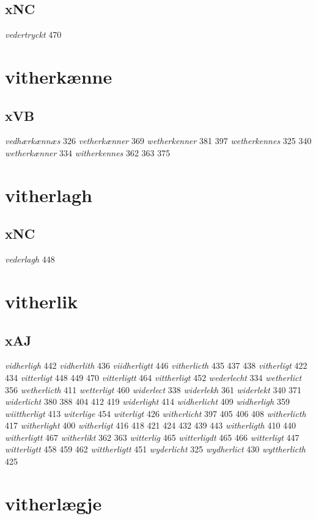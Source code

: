 \documentclass[a4paper,twocolumn]{article}
\begin{document}
\subsection{xNC}
\label{sec:org443a210}
\emph{vedertryckt} 470 
\section{vitherkænne}
\label{sec:org26f16c8}
\subsection{xVB}
\label{sec:orgbdf1f46}
\emph{vedhærkænnæs} 326 \emph{vetherkænner} 369 \emph{wetherkenner} 381 397 \emph{wetherkennes} 325 340 \emph{wetherkænner} 334 \emph{witherkennes} 362 363 375 
\section{vitherlagh}
\label{sec:orga76be92}
\subsection{xNC}
\label{sec:org970b84c}
\emph{vederlagh} 448 
\section{vitherlik}
\label{sec:org46df9df}
\subsection{xAJ}
\label{sec:org80afa6c}
\emph{vidherligh} 442 \emph{vidherlith} 436 \emph{viidherligtt} 446 \emph{vitherlicth} 435 437 438 \emph{vitherligt} 422 434 \emph{vitterligt} 448 449 470 \emph{vitterligtt} 464 \emph{vittherligt} 452 \emph{wederlecht} 334 \emph{wetherlict} 356 \emph{wetherlicth} 411 \emph{wetterligt} 460 \emph{widerlect} 338 \emph{widerlekh} 361 \emph{widerlekt} 340 371 \emph{widerlicht} 380 388 404 412 419 \emph{widerlight} 414 \emph{widherlicht} 409 \emph{widherligh} 359 \emph{wiittherligt} 413 \emph{witerlige} 454 \emph{witerligt} 426 \emph{witherlicht} 397 405 406 408 \emph{witherlicth} 417 \emph{witherlight} 400 \emph{witherligt} 416 418 421 424 432 439 443 \emph{witherligth} 410 440 \emph{witherligtt} 467 \emph{witherlikt} 362 363 \emph{witterlig} 465 \emph{witterligdt} 465 466 \emph{witterligt} 447 \emph{witterligtt} 458 459 462 \emph{wittherligtt} 451 \emph{wyderlicht} 325 \emph{wydherlict} 430 \emph{wyttherlicth} 425 
\section{vitherlægje}
\label{sec:org36a9145}
\end{document}
